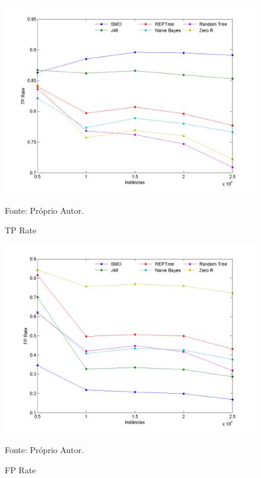 \documentclass[
	12pt,				%
	openright,			%
	oneside,	
	a4paper,				%
	english,				%
	brazil				%
]{abntex2/abntex2} %
\begin{document}
\begin{figure}[!htb]
	\caption{\label{figtpRate} TP Rate}
	\begin{center}
		\includegraphics[scale=0.8]{graphs/tp_graph.png}
	\end{center}
	Fonte: Próprio Autor.
\end{figure}

\begin{figure}[!htb]
	\caption{\label{figfpRate} FP Rate}
	\begin{center}
		\includegraphics[scale=0.8]{graphs/fp_graph.png}
	\end{center}
	Fonte: Próprio Autor.
\end{figure}
	
\end{document}
